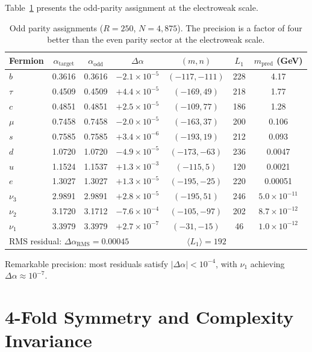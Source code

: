 \documentclass[11pt,a4paper]{article}
\begin{document}
Table~\ref{tab:odd} presents the odd-parity assignment at the electroweak scale.

\begin{table}[h!]
\centering
\caption{Odd parity assignments ($R=250$, $N=4{,}875$). The precision is a factor of four better than the even parity sector at the electroweak scale.}
\label{tab:odd}
\small
\begin{tabular}{lcccccc}
\toprule
Fermion & $\alpha_{\text{target}}$ & $\alpha_{\text{odd}}$ & $\Delta\alpha$ & $(m,n)$ & $L_1$ & $m_{\text{pred}}$ (GeV) \\
\midrule
$b$ & 0.3616 & 0.3616 & $-2.1\times10^{-5}$ & $(-117,-111)$ & 228 & 4.17 \\
$\tau$ & 0.4509 & 0.4509 & $+4.4\times10^{-5}$ & $(-169,49)$ & 218 & 1.77 \\
$c$ & 0.4851 & 0.4851 & $+2.5\times10^{-5}$ & $(-109,77)$ & 186 & 1.28 \\
$\mu$ & 0.7458 & 0.7458 & $-2.0\times10^{-5}$ & $(-163,37)$ & 200 & 0.106 \\
$s$ & 0.7585 & 0.7585 & $+3.4\times10^{-6}$ & $(-193,19)$ & 212 & 0.093 \\
$d$ & 1.0720 & 1.0720 & $-4.9\times10^{-5}$ & $(-173,-63)$ & 236 & 0.0047 \\
$u$ & 1.1524 & 1.1537 & $+1.3\times10^{-3}$ & $(-115,5)$ & 120 & 0.0021 \\
$e$ & 1.3027 & 1.3027 & $+1.3\times10^{-5}$ & $(-195,-25)$ & 220 & 0.00051 \\
$\nu_3$ & 2.9891 & 2.9891 & $+2.8\times10^{-5}$ & $(-195,51)$ & 246 & $5.0\times10^{-11}$ \\
$\nu_2$ & 3.1720 & 3.1712 & $-7.6\times10^{-4}$ & $(-105,-97)$ & 202 & $8.7\times10^{-12}$ \\
$\nu_1$ & 3.3979 & 3.3979 & $+2.7\times10^{-7}$ & $(-31,-15)$ & 46 & $1.0\times10^{-12}$ \\
\midrule
\multicolumn{4}{l}{RMS residual: $\Delta\alpha_{\text{RMS}} = 0.00045$} & \multicolumn{2}{c}{$\langle L_1 \rangle = 192$} \\
\bottomrule
\end{tabular}
\end{table}

Remarkable precision: most residuals satisfy $|\Delta\alpha| < 10^{-4}$, with $\nu_1$ achieving $\Delta\alpha \approx 10^{-7}$.

\section{4-Fold Symmetry and Complexity Invariance}
\label{sec:complexity}
\end{document}
